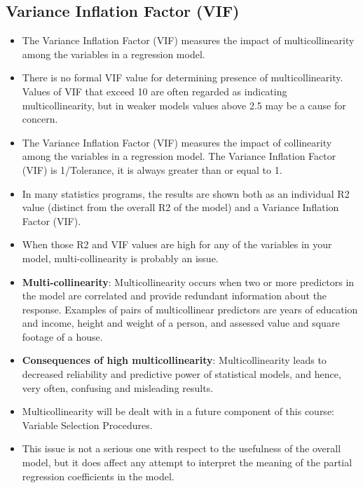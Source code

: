 \documentclass[a4paper,12pt]{article}
\begin{document}
\subsection{Variance Inflation Factor (VIF)}
\begin{itemize}
\item  The Variance Inflation Factor (VIF) measures the impact of multicollinearity among the variables in a
regression model.
\item  There is no formal VIF value for determining presence of multicollinearity. Values of VIF that exceed 10
are often regarded as indicating multicollinearity, but in weaker models values above 2.5 may be a cause
for concern.

\item The Variance Inflation Factor (VIF) measures the impact of collinearity among the variables in a regression model. The Variance Inflation Factor (VIF) is 1/Tolerance, it is always greater than or equal to 1. 


\item  In many statistics programs, the results are shown both as an individual R2 value (distinct from the
overall R2 of the model) and a Variance Inflation Factor (VIF).
\item  When those R2 and VIF values are high for any of the variables in your model, multi-collinearity is
probably an issue.

\item \textbf{Multi-collinearity}: Multicollinearity occurs when two or more predictors in the model are
correlated and provide redundant information about the response. Examples of pairs of multicollinear predictors are years of education and income, height and weight of a person, and assessed value and square footage
of a house.

\item \textbf{Consequences of high multicollinearity}:
Multicollinearity leads to decreased reliability and predictive power of statistical models, and hence, very often, confusing and misleading results.
\item Multicollinearity will be dealt with in a future component of this course: Variable Selection Procedures.
\item This issue is not a serious one with respect to the
usefulness of the overall model, but it does affect any attempt to interpret the meaning of the partial regression
coefficients in the model.


\end{itemize}
\end{document}
